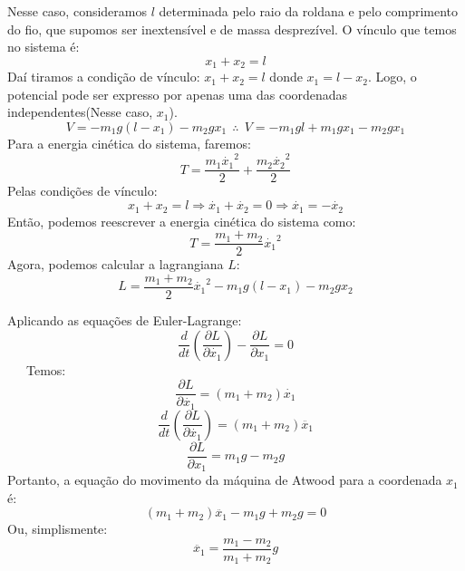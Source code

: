 \documentclass{article}
\begin{document}
Nesse caso, consideramos $l$ determinada pelo raio da roldana e pelo
comprimento do fio, que supomos ser inextensível e de massa desprezível.
O vínculo que temos no sistema é:
\begin{equation}
    x_1+x_2=l
\end{equation}
Daí tiramos a condição de vínculo: $x_1+x_2=l$
donde $x_1=l-x_2$.
Logo, o potencial pode ser expresso por apenas uma das coordenadas
independentes(Nesse caso, $x_1$).
\begin{equation}
    V=-m_1g(l-x_1)-m_2gx_1
    \ \ \therefore \ \ 
    V=-m_1gl+m_1gx_1-m_2gx_1
\end{equation}
Para a energia cinética do sistema, faremos:
\begin{equation}
    T=\frac{m_1\dot{x_1}^{2}}{2} +\frac{m_2\dot{x_2}^{2}}{2}
\end{equation}
Pelas condições de vínculo:
\begin{equation}
    x_1+x_2=l \Rightarrow  \dot{x_1}+\dot{x_2}=0 \Rightarrow  \dot{x_1}=-\dot{x_2}
\end{equation}
Então, podemos reescrever a energia cinética do sistema como:
\begin{equation}
    T= \frac{m_1+m_2}{2}\dot{x_1}^{2}
\end{equation}
Agora, podemos calcular a lagrangiana $L$:
\begin{equation}
    L= \frac{m_1+m_2}{2}\dot{x_1}^{2} -m_1g(l-x_1)-m_2gx_2
\end{equation}

Aplicando as equações de Euler-Lagrange:
\begin{equation}
    \frac{d}{dt}(\frac{\partial L}{\partial \dot{x_1}})-
    \frac{\partial L}{\partial x_1}=0
\end{equation} 
\ \ \ Temos: 
\begin{equation}
    \frac{\partial L}{\partial \dot{x_1}}=(m_1+m_2)\dot{x_1} 
\end{equation}
\begin{equation}
    \frac{d}{dt}(\frac{\partial L}{\partial \dot{x_1}})=(m_1+m_2)\ddot{x_1}
\end{equation}
\begin{equation}
    \frac{\partial L}{\partial x_1}= m_1g-m_2g
\end{equation}
Portanto, a equação do movimento da máquina de Atwood para a coordenada $x_1$ é:
\begin{equation}
    (m_1+m_2)\ddot{x_1}-m_1g+m_2g=0
\end{equation}
Ou, simplismente:
\begin{equation}
    \ddot{x_1}=\frac{m_1-m_2}{m_1+m_2}g 
\end{equation}
\end{document}
